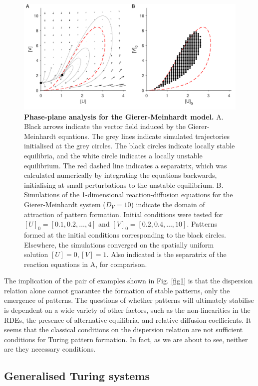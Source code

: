 \begin{figure}[ht]
  \centering
  \includegraphics[width=\linewidth]{Figure2}
  \caption{\textbf{Phase-plane analysis for the Gierer-Meinhardt model.} A. Black arrows indicate the vector field induced by the Gierer-Meinhardt equations. The grey lines indicate simulated trajectories initialised at the grey circles. The black circles indicate locally stable equilibria, and the white circle indicates a locally unstable equilibrium. The red dashed line indicates a separatrix, which was calculated numerically by integrating the equations backwards, initialising at small perturbations to the unstable equilibrium. B. Simulations of the 1-dimensional reaction-diffusion equations for the Gierer-Meinhardt system ($D_V=10$) indicate the domain of attraction of pattern formation. Initial conditions were tested for $[U]_0 = [0.1, 0.2, \dots, 4]$ and $[V]_0 = [0.2, 0.4, \dots, 10]$. Patterns formed at the initial conditions corresponding to the black circles. Elsewhere, the simulations converged on the spatially uniform solution $[U]=0,[V]=1$. Also indicated is the separatrix of the reaction equations in A, for comparison.}
  \label{phase}
\end{figure}

The implication of the pair of examples shown in Fig. \ref{fig1} is that the dispersion relation alone cannot guarantee the formation of stable patterns, only the emergence of patterns. The questions of whether patterns will ultimately stabilise is dependent on a wide variety of other factors, such as the non-linearities in the RDEs, the presence of alternative equilibria, and relative diffusion coefficients. It seems that the classical conditions on the dispersion relation are not sufficient conditions for Turing pattern formation. In fact, as we are about to see, neither are they necessary conditions.

\subsection*{Generalised Turing systems}

